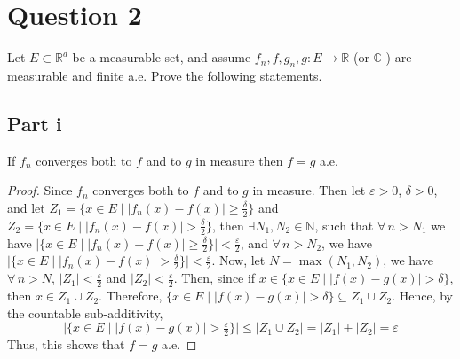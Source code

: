 \section{Question 2}

\begin{question}
   Let $E \subset \mathbb{R}^d$ be a measurable set, and assume $f_n, f, g_n, g: E \rightarrow \mathbb{R}$ (or $\mathbb{C}$ ) are measurable and finite a.e. Prove the following statements.
\end{question}

\subsection{Part i}

\begin{question}
    If $f_n$ converges both to $f$ and to $g$ in measure then $f=g$ a.e.
\end{question}

\begin{answer}
    \begin{proof}
        Since $f_n$ converges both to $f$ and to $g$ in measure. Then let $\varepsilon > 0$, $\delta > 0$, and let $Z_1 = \{x \in E \mid \lvert f_n(x) - f(x) \rvert \geq \tfrac{\delta}{2}\}$ and $Z_2 = \{x \in E \mid \lvert f_{n}(x) - f(x) \rvert > \tfrac{\delta}{2}\}$, then $\exists N_1, N_2 \in \mathbb{N}$, such that $\forall\, n > N_1$ we have $\lvert \{x \in E \mid \lvert f_{n}(x) - f(x) \rvert \geq \tfrac{\delta}{2}\} \rvert < \tfrac{\varepsilon}{2}$, and $\forall\, n > N_2$, we have $\lvert \{x \in E \mid \lvert f_{n}(x) - f(x) \rvert > \tfrac{\delta}{2}\} \rvert < \tfrac{\varepsilon}{2}$. Now, let $N = \max (N_1,N_2)$, we have $\forall \, n > N$, $\lvert Z_1 \rvert < \tfrac{\varepsilon}{2}$ and $\lvert Z_2 \rvert < \tfrac{\varepsilon}{2}$. Then, since if $x \in \{x \in E \mid \lvert f(x) - g(x) \rvert > \delta\}$, then $x \in Z_1 \cup Z_2$. Therefore, $\{x \in E \mid \lvert f(x)-g(x) \rvert > \delta\} \subseteq
        Z_1 \cup Z_2$. Hence, by the countable sub-additivity,
        \begin{equation}
            \lvert \{x \in E \mid \lvert f(x)-g(x) \rvert > \tfrac{\varepsilon}{2}\} \rvert \leq \lvert Z_1 \cup Z_2 \rvert = \lvert Z_1 \rvert + \lvert Z_2 \rvert = \varepsilon
        \end{equation}
        Thus, this shows that $f = g$ a.e.
    \end{proof}
\end{answer}

